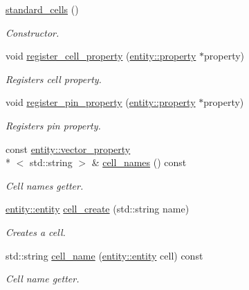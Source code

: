 \begin{DoxyCompactItemize}
\item 
\hyperlink{classophidian_1_1standard__cell_1_1standard__cells_a550904ff92dda77064942532e4ffb0cd}{standard\-\_\-cells} ()
\begin{DoxyCompactList}\small\item\em Constructor. \end{DoxyCompactList}\item 
void \hyperlink{classophidian_1_1standard__cell_1_1standard__cells_ad2320be742c38f15a3bf267a829f1ea6}{register\-\_\-cell\-\_\-property} (\hyperlink{classophidian_1_1entity_1_1property}{entity\-::property} $\ast$property)
\begin{DoxyCompactList}\small\item\em Registers cell property. \end{DoxyCompactList}\item 
void \hyperlink{classophidian_1_1standard__cell_1_1standard__cells_ab3736094116a3730c9beef2cef923021}{register\-\_\-pin\-\_\-property} (\hyperlink{classophidian_1_1entity_1_1property}{entity\-::property} $\ast$property)
\begin{DoxyCompactList}\small\item\em Registers pin property. \end{DoxyCompactList}\item 
const \hyperlink{classophidian_1_1entity_1_1vector__property}{entity\-::vector\-\_\-property}\\*
$<$ std\-::string $>$ \& \hyperlink{classophidian_1_1standard__cell_1_1standard__cells_a8fdfdb96a4173eb0881287f3ad8c191b}{cell\-\_\-names} () const 
\begin{DoxyCompactList}\small\item\em Cell names getter. \end{DoxyCompactList}\item 
\hyperlink{classophidian_1_1entity_1_1entity}{entity\-::entity} \hyperlink{classophidian_1_1standard__cell_1_1standard__cells_ac4b65b059e571d86bfbad04132bc29b9}{cell\-\_\-create} (std\-::string name)
\begin{DoxyCompactList}\small\item\em Creates a cell. \end{DoxyCompactList}\item 
std\-::string \hyperlink{classophidian_1_1standard__cell_1_1standard__cells_aa5953f7a39220cdfad7871d4cd34f2e9}{cell\-\_\-name} (\hyperlink{classophidian_1_1entity_1_1entity}{entity\-::entity} cell) const 
\begin{DoxyCompactList}\small\item\em Cell name getter. \end{DoxyCompactList}\item 

\end{DoxyCompactItemize}
